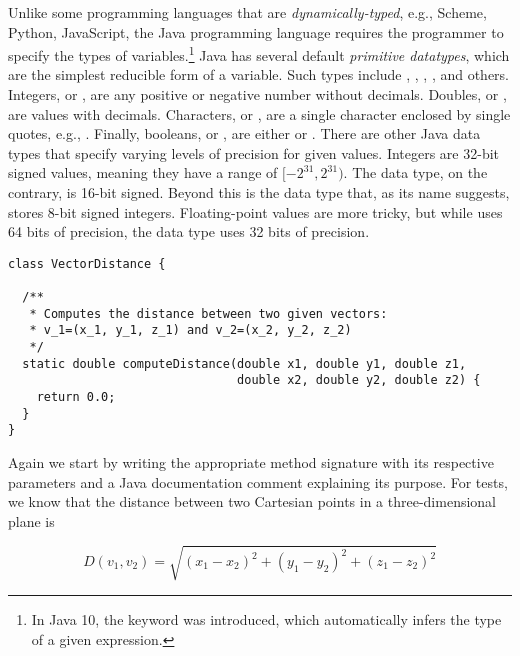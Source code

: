 Unlike some programming languages that are \emph{dynamically-typed}, e.g., Scheme, Python, JavaScript, the Java programming language requires the programmer to specify the types of variables.\footnote{In Java 10, the  keyword was introduced, which automatically infers the type of a given expression.} Java has several default \emph{primitive datatypes}, which are the simplest reducible form of a variable. Such types include , , , , and others. Integers, or , are any positive or negative number without decimals. Doubles, or , are values with decimals. Characters, or , are a single character enclosed by single quotes, e.g., . Finally, booleans, or , are either  or . There are other Java data types that specify varying levels of precision for given values. Integers are 32-bit signed values, meaning they have a range of $[-2^{31}, 2^{31})$. The  data type, on the contrary, is 16-bit signed. Beyond this is the  data type that, as its name suggests, stores 8-bit signed integers. Floating-point values are more tricky, but while  uses 64 bits of precision, the  data type uses 32 bits of precision.


\begin{lstlisting}[language=MyJava]
class VectorDistance {

  /**
   * Computes the distance between two given vectors:
   * v_1=(x_1, y_1, z_1) and v_2=(x_2, y_2, z_2)
   */
  static double computeDistance(double x1, double y1, double z1, 
                                double x2, double y2, double z2) {
    return 0.0;
  }
}
\end{lstlisting}

Again we start by writing the appropriate method signature with its respective parameters and a Java documentation comment explaining its purpose. For tests, we know that the distance between two Cartesian points in a three-dimensional plane is 

\[
D(v_1, v_2) = \sqrt{(x_1 - x_2)^2 + (y_1 - y_2)^2 + (z_1 - z_2)^2}
\]

